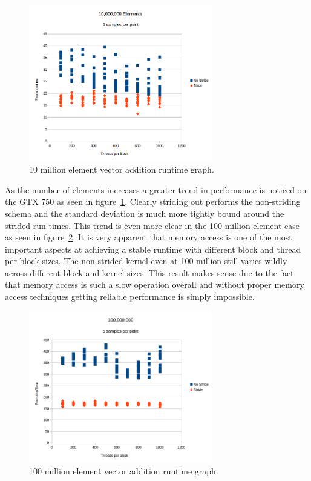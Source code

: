 \documentclass[letterpaper,twocolumn]{article}
\begin{document}
\begin{figure}
 \centering
 \includegraphics[width=8cm]{10,000,000_graph.png}
 \caption{10 million element vector addition runtime graph.}
 \label{fig:10million}
\end{figure}
As the number of elements increases a greater trend in performance is noticed on the GTX 750 as seen in figure~\ref{fig:10million}. Clearly striding out performs the non-striding schema and the standard deviation is much more tightly bound around the strided run-times. This trend is even more clear in the 100 million element case as seen in figure~\ref{fig:100million}. It is very apparent that memory access is one of the most important aspects at achieving a stable runtime with different block and thread per block sizes. The non-strided kernel even at 100 million still varies wildly across different block and kernel sizes. This result makes sense due to the fact that memory access is such a slow operation overall and without proper memory access techniques getting reliable performance is simply impossible.

\begin{figure}
 \centering
 \includegraphics[width=8cm]{100,000,000_graph.png}
 \caption{100 million element vector addition runtime graph.}
 \label{fig:100million}
\end{figure}
\end{document}
